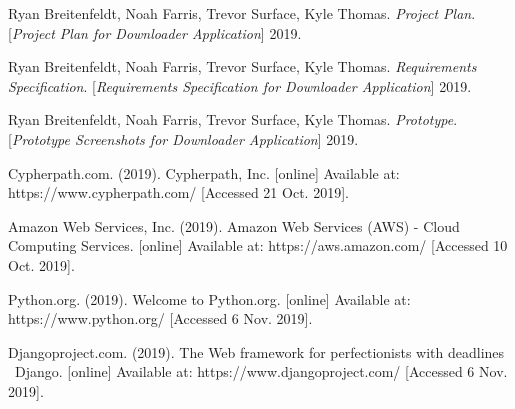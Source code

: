 \documentclass{article}
\begin{document}
\newpage
    \begin{thebibliography}{7}
    Ryan Breitenfeldt, Noah Farris, Trevor Surface, Kyle Thomas.
    \textit{Project Plan}.
    [\textit{Project Plan for Downloader Application}] 2019.

    Ryan Breitenfeldt, Noah Farris, Trevor Surface, Kyle Thomas.
    \textit{Requirements Specification}.
    [\textit{Requirements Specification for Downloader Application}] 2019.

    Ryan Breitenfeldt, Noah Farris, Trevor Surface, Kyle Thomas.
    \textit{Prototype}.
    [\textit{Prototype Screenshots for Downloader Application}] 2019.


    Cypherpath.com. (2019). Cypherpath, Inc. [online] Available at: https://www.cypherpath.com/ [Accessed 21 Oct. 2019].

    Amazon Web Services, Inc. (2019). Amazon Web Services (AWS) - Cloud Computing Services. [online] Available at: https://aws.amazon.com/ [Accessed 10 Oct. 2019].


    Python.org. (2019). Welcome to Python.org. [online] Available at: https://www.python.org/ [Accessed 6 Nov. 2019].

    Djangoproject.com. (2019). The Web framework for perfectionists with deadlines \textbar\ Django. [online] Available at: https://www.djangoproject.com/ [Accessed 6 Nov. 2019].
    \end{thebibliography}

\end{document}
